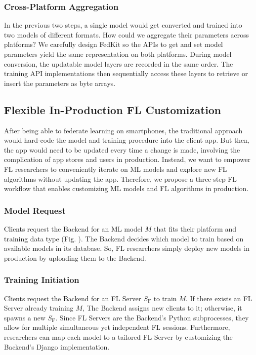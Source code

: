 \documentclass[letterpaper]{article} %
\begin{document}
\subsubsection{Cross-Platform Aggregation}
In the previous two steps,
a single model would get converted and trained into two models of different
formats.
How could we aggregate their parameters across platforms?
We carefully design FedKit so the APIs to get and set model parameters
yield the same representation on both platforms.
During model conversion,
the updatable model layers are recorded in the same order.
The training API implementations then sequentially access these layers to
retrieve or insert the parameters as byte arrays.

\subsection{Flexible In-Production FL Customization}
\newcommand{\model}{$M$}
\newcommand{\fs}{$S_\mathrm F$}
After being able to federate learning on smartphones,
the traditional approach would hard-code the model and training procedure
into the client app.
But then, the app would need to be updated every time a change is made,
involving the complication of app stores and users in production.
Instead,
we want to empower FL researchers to conveniently iterate on ML models and
explore new FL algorithms
without updating the app.
Therefore, we propose a three-step FL workflow that
enables customizing ML models and FL algorithms in production.

\subsubsection{Model Request}
Clients request the Backend for an ML model \model{} that fits
their platform and training data type (Fig. ). %
The Backend decides which model to train based on
available models in its database.
So, FL researchers simply deploy new models in production by uploading them to
the Backend.

\subsubsection{Training Initiation}
Clients request the Backend for an FL Server \fs{} to train \model.
If there exists an FL Server already training \model,
The Backend assigns new clients to it;
otherwise, it spawns a new \fs.
Since FL Servers are the Backend's Python subprocesses,
they allow for multiple simultaneous yet independent FL sessions.
Furthermore, researchers can map each model to a tailored FL Server by
customizing the Backend's Django implementation.
\end{document}
